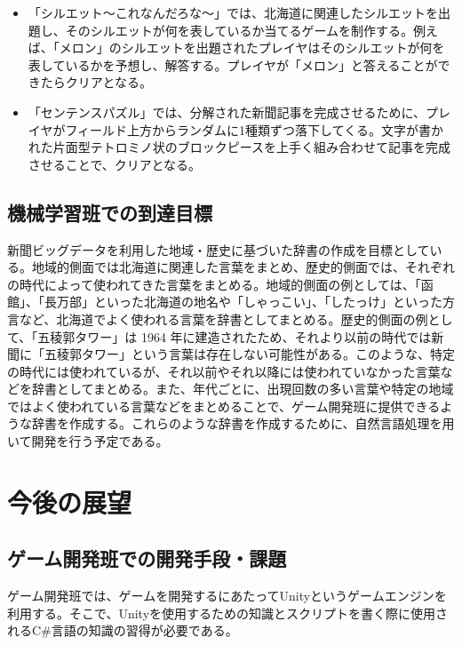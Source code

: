 \begin{itemize}
    \item 「シルエット～これなんだろな～」では、北海道に関連したシルエットを出題し、そのシルエットが何を表しているか当てるゲームを制作する。例えば、「メロン」のシルエットを出題されたプレイヤはそのシルエットが何を表しているかを予想し、解答する。プレイヤが「メロン」と答えることができたらクリアとなる。\\
    
    \item 「センテンスパズル」では、分解された新聞記事を完成させるために、プレイヤがフィールド上方からランダムに1種類ずつ落下してくる。文字が書かれた片面型テトロミノ状のブロックピースを上手く組み合わせて記事を完成させることで、クリアとなる。\\
    
\end{itemize}


\subsection{機械学習班での到達目標}
新聞ビッグデータを利用した地域・歴史に基づいた辞書の作成を目標としている。地域的側面では北海道に関連した言葉をまとめ、歴史的側面では、それぞれの時代によって使われてきた言葉をまとめる。地域的側面の例としては、「函館」、「長万部」といった北海道の地名や「しゃっこい」、「したっけ」といった方言など、北海道でよく使われる言葉を辞書としてまとめる。歴史的側面の例として、「五稜郭タワー」は 1964 年に建造されたため、それより以前の時代では新聞に「五稜郭タワー」という言葉は存在しない可能性がある。このような、特定の時代には使われているが、それ以前やそれ以降には使われていなかった言葉などを辞書としてまとめる。また、年代ごとに、出現回数の多い言葉や特定の地域ではよく使われている言葉などをまとめることで、ゲーム開発班に提供できるような辞書を作成する。これらのような辞書を作成するために、自然言語処理を用いて開発を行う予定である。

\newpage
\section{今後の展望}
\subsection{ゲーム開発班での開発手段・課題}
ゲーム開発班では、ゲームを開発するにあたってUnityというゲームエンジンを利用する。そこで、Unityを使用するための知識とスクリプトを書く際に使用されるC\#言語の知識の習得が必要である。

